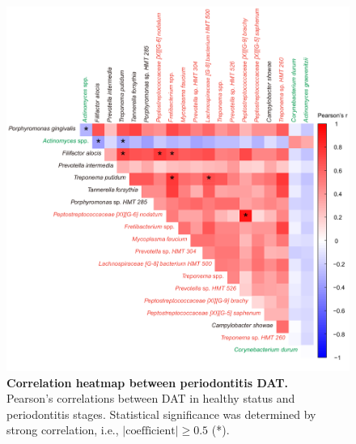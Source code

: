 \documentclass[11pt, a4paper, onecolumn, oneside]{report}
\begin{document}
            \begin{figure}[p]
                \centering
                \includegraphics[width=\linewidth]{Figures/Periodontitis/Figure_3.pdf}
                \caption[Correlation heatmap between periodontitis DAT]{\textbf{Correlation heatmap between periodontitis DAT.} \\
                    Pearson's correlations between DAT in healthy status and periodontitis stages. Statistical significance was determined by strong correlation, i.e., $| \textrm{coefficient} | \ge 0.5$ (*).}
                \label{fig:Periodontitis-correlation}
            \end{figure}
            \clearpage
\end{document}
